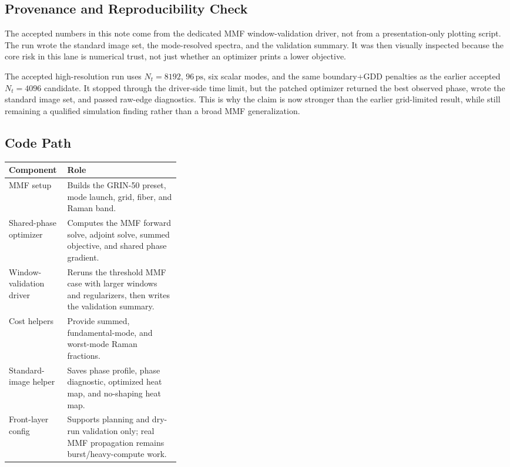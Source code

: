 \documentclass[11pt]{article}
\begin{document}
\subsection*{Provenance and Reproducibility Check}

The accepted numbers in this note come from the dedicated MMF window-validation
driver, not from a presentation-only plotting script. The run wrote the
standard image set, the mode-resolved spectra, and the validation summary. It
was then visually inspected because the core risk in this lane is numerical
trust, not just whether an optimizer prints a lower objective.

The accepted high-resolution run uses \(N_t=8192\), \(96\,\mathrm{ps}\), six
scalar modes, and the same boundary+GDD penalties as the earlier accepted
\(N_t=4096\) candidate. It stopped through the driver-side time limit, but the
patched optimizer returned the best observed phase, wrote the standard image
set, and passed raw-edge diagnostics. This is why the claim is now stronger
than the earlier grid-limited result, while still remaining a qualified
simulation finding rather than a broad MMF generalization.

\subsection*{Code Path}

\begin{tabularx}{\linewidth}{@{}p{0.34\linewidth}X@{}}
\toprule
\textbf{Component} & \textbf{Role} \\
\midrule
MMF setup & Builds the GRIN-50 preset, mode launch, grid, fiber, and Raman band. \\
Shared-phase optimizer & Computes the MMF forward solve, adjoint solve, summed objective, and shared phase gradient. \\
Window-validation driver & Reruns the threshold MMF case with larger windows and regularizers, then writes the validation summary. \\
Cost helpers & Provide summed, fundamental-mode, and worst-mode Raman fractions. \\
Standard-image helper & Saves phase profile, phase diagnostic, optimized heat map, and no-shaping heat map. \\
Front-layer config & Supports planning and dry-run validation only; real MMF propagation remains burst/heavy-compute work. \\
\bottomrule
\end{tabularx}
\end{document}
